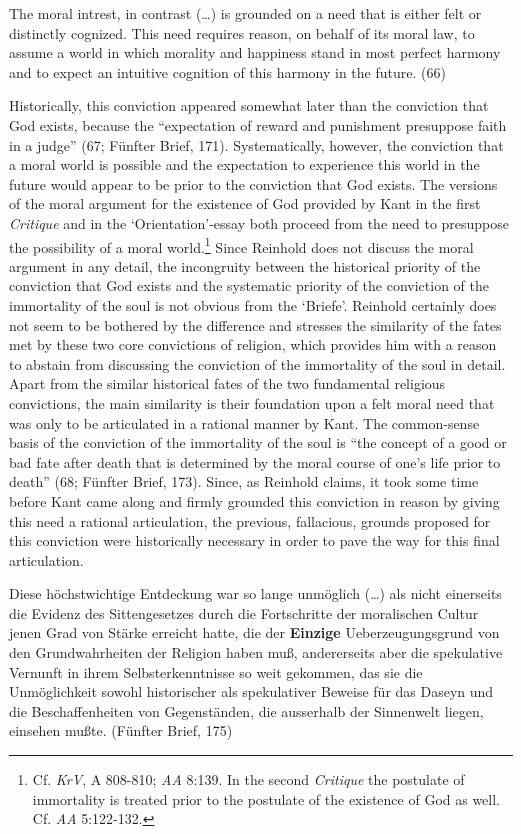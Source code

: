 The moral intrest, in contrast (\ldots ) is grounded on a need that is either felt or distinctly cognized. This need requires reason, on behalf of its moral law, to assume a world in which morality and happiness stand in most perfect harmony and to expect an intuitive cognition of this harmony in the future. (66) 

Historically, this conviction appeared somewhat later than the conviction that God exists, because the ``expectation of reward and punishment presuppose faith in a judge'' (67; F\"{u}nfter Brief, 171). Systematically, however, the conviction that a moral world is possible and the expectation to experience this world in the future would appear to be prior to the conviction that God exists. The versions of the moral argument for the existence of God provided by Kant in the first \textit{Critique }and in the `Orientation'{-}essay both proceed from the need to presuppose the possibility of a moral world.\footnote{ Cf. \textit{KrV}, A 808{-}810; \textit{AA} 8:139. In the second \textit{Critique} the postulate of immortality is treated prior to the postulate of the existence of God as well. Cf. \textit{AA} 5:122{-}132. } Since Reinhold does not discuss the moral argument in any detail, the incongruity between the historical priority of the conviction that God exists and the systematic priority of the conviction of the immortality of the soul is not obvious from the `Briefe'. Reinhold certainly does not seem to be bothered by the difference and stresses the similarity of the fates met by these two core convictions of religion, which provides him with a reason to abstain from discussing the conviction of the immortality of the soul in detail. Apart from the similar historical fates of the two fundamental religious convictions, the main similarity is their foundation upon a felt moral need that was only to be articulated in a rational manner by Kant. The common{-}sense basis of the conviction of the immortality of the soul is ``the concept of a good or bad fate after death that is determined by the moral course of one's life prior to death'' (68; F\"{u}nfter Brief, 173). Since, as Reinhold claims, it took some time before Kant came along and firmly grounded this conviction in reason by giving this need a rational articulation, the previous, fallacious, grounds proposed for this conviction were historically necessary in order to pave the way for this final articulation. 

Diese h\"{o}chstwichtige Entdeckung war so lange unm\"{o}glich (\ldots ) als nicht einerseits die Evidenz des Sittengesetzes durch die Fortschritte der moralischen Cultur jenen Grad von St\"{a}rke erreicht hatte, die der \textbf{Einzige} Ueberzeugungsgrund von den Grundwahrheiten der Religion haben mu\ss{}, andererseits aber die spekulative Vernunft in ihrem Selbsterkenntnisse so weit gekommen, das sie die Unm\"{o}glichkeit sowohl historischer als spekulativer Beweise f\"{u}r das Daseyn und die Beschaffenheiten von Gegenst\"{a}nden, die ausserhalb der Sinnenwelt liegen, einsehen mu\ss{}te. (F\"{u}nfter Brief, 175)

